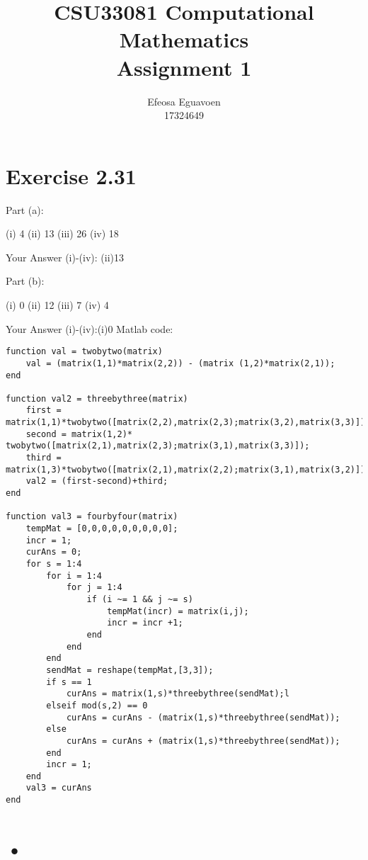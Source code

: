 \documentclass[12pt,a4paper]{report}
\title{CSU33081 Computational Mathematics \\ Assignment 1}
\author{Efeosa Eguavoen \\ 17324649}
\begin{document}
\maketitle
\newpage
\section{Exercise 2.31 }
Part (a):

    (i) 4 
    (ii) 13
    (iii) 26
    (iv) 18

Your Answer (i)-(iv): (ii)13

Part (b):

    (i) 0
    (ii) 12
    (iii)  7
    (iv)  4

Your Answer (i)-(iv):(i)0
\newline
\newline
Matlab code: 
\newline
\begin{lstlisting}
function val = twobytwo(matrix)
    val = (matrix(1,1)*matrix(2,2)) - (matrix (1,2)*matrix(2,1));
end

function val2 = threebythree(matrix)
    first = matrix(1,1)*twobytwo([matrix(2,2),matrix(2,3);matrix(3,2),matrix(3,3)]);
    second = matrix(1,2)* twobytwo([matrix(2,1),matrix(2,3);matrix(3,1),matrix(3,3)]);
    third = matrix(1,3)*twobytwo([matrix(2,1),matrix(2,2);matrix(3,1),matrix(3,2)]);
    val2 = (first-second)+third;
end

function val3 = fourbyfour(matrix)
    tempMat = [0,0,0,0,0,0,0,0,0];
    incr = 1;
    curAns = 0;
    for s = 1:4 
        for i = 1:4
            for j = 1:4
                if (i ~= 1 && j ~= s)
                    tempMat(incr) = matrix(i,j);
                    incr = incr +1;
                end
            end
        end
        sendMat = reshape(tempMat,[3,3]);
        if s == 1
            curAns = matrix(1,s)*threebythree(sendMat);l
        elseif mod(s,2) == 0
            curAns = curAns - (matrix(1,s)*threebythree(sendMat));
        else
            curAns = curAns + (matrix(1,s)*threebythree(sendMat));
        end
        incr = 1;
    end
    val3 = curAns
end

\end{lstlisting}

\section{•}
\end{document}
